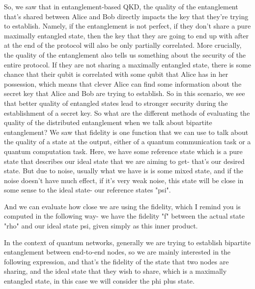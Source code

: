 So, we saw that in entanglement-based QKD, the quality of the entanglement that's shared between Alice and Bob directly impacts the key that they're trying to establish. Namely, if the entanglement is not perfect, if they don't share a pure maximally entangled state, then the key that they are going to end up with after at the end of the protocol will also be only partially correlated. More crucially, the quality of the entanglement also tells us something about the security of the entire protocol. If they are not sharing a maximally entangled state, there is some chance that their qubit is correlated with some qubit that Alice has in her possession, which means that clever Alice can find some information about the secret key that Alice and Bob are trying to establish. So in this scenario, we see that better quality of entangled states lead to stronger security during the establishment of a secret key. So what are the different methods of evaluating the quality of the distributed entanglement when we talk about bipartite entanglement? We saw that fidelity is one function that we can use to talk about the quality of a state at the output, either of a quantum communication task or a quantum computation task. Here, we have some reference state which is a pure state that describes our ideal state that we are aiming to get- that's our desired state. But due to noise, usually what we have is is some mixed state, and if the noise doesn't have much effect, if it's very weak noise, this state will be close in some sense to the ideal state- our reference states "psi".

And we can evaluate how close we are using the fidelity, which I remind you is computed in the following way- we have the fidelity "f" between the actual state "rho" and our ideal state psi, given simply as this inner product.

In the context of quantum networks, generally we are trying to establish bipartite entanglement between end-to-end nodes, so we are mainly interested in the following expression, and that's the fidelity of the state that two nodes are sharing, and the ideal state that they wish to share, which is a maximally entangled state, in this case we will consider the phi plus state.


